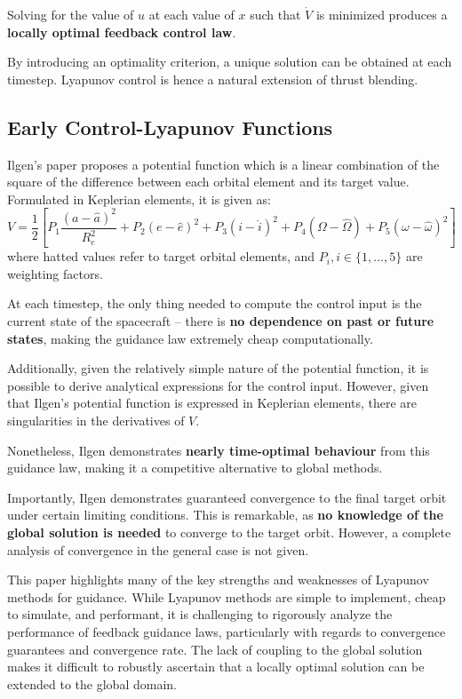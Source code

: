 Solving for the value of \(u\) at each value of \(x\) such that \(\dot{V}\) is minimized produces a \textbf{locally optimal feedback control law}.

By introducing an optimality criterion, a unique solution can be obtained at each timestep. Lyapunov control is hence a natural extension of thrust blending.

\subsection{Early Control-Lyapunov Functions}

Ilgen's paper proposes a potential function which is a linear combination of the square of the difference between each orbital element and its target value. Formulated in Keplerian elements, it is given as:
\begin{equation}
  V = \frac{1}{2} \left[P_1 \frac{(a - \hat{a})^2}{R_e^2} + P_2 (e - \hat{e})^2 + P_3 (i - \hat{i})^2 + P_4 (\Omega - \hat{\Omega}) + P_5 (\omega - \hat{\omega})^2  \right]
  \label{eq:ilgen_potential}
\end{equation}
where hatted values refer to target orbital elements, and \(P_i, i \in \{1, ..., 5\}\) are weighting factors.

At each timestep, the only thing needed to compute the control input is the current state of the spacecraft -- there is \textbf{no dependence on past or future states}, making the guidance law extremely cheap computationally.

Additionally, given the relatively simple nature of the potential function, it is possible to derive analytical expressions for the control input. However, given that Ilgen's potential function is expressed in Keplerian elements, there are singularities in the derivatives of \(V\).

Nonetheless, Ilgen demonstrates \textbf{nearly time-optimal behaviour} from this guidance law, making it a competitive alternative to global methods.

Importantly, Ilgen demonstrates guaranteed convergence to the final target orbit under certain limiting conditions. This is remarkable, as \textbf{no knowledge of the global solution is needed} to converge to the target orbit. However, a complete analysis of convergence in the general case is not given.

This paper highlights many of the key strengths and weaknesses of Lyapunov methods for guidance. While Lyapunov methods are simple to implement, cheap to simulate, and performant, it is challenging to rigorously analyze the performance of feedback guidance laws, particularly with regards to convergence guarantees and convergence rate. The lack of coupling to the global solution makes it difficult to robustly ascertain that a locally optimal solution can be extended to the global domain.


